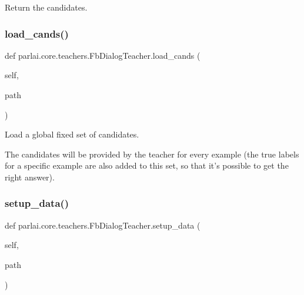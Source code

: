 \begin{DoxyVerb}Return the candidates.
\end{DoxyVerb}
 \mbox{\label{classparlai_1_1core_1_1teachers_1_1FbDialogTeacher_ae6f10486ddf691ee868d33ea2c9dc295}} 
\subsubsection{\texorpdfstring{load\+\_\+cands()}{load\_cands()}}
{\footnotesize\ttfamily def parlai.\+core.\+teachers.\+Fb\+Dialog\+Teacher.\+load\+\_\+cands (\begin{DoxyParamCaption}\item[{}]{self,  }\item[{}]{path }\end{DoxyParamCaption})}

\begin{DoxyVerb}Load a global fixed set of candidates.

The candidates will be provided by the teacher for every example (the true
labels for a specific example are also added to this set, so that it's possible
to get the right answer).
\end{DoxyVerb}
 \mbox{\label{classparlai_1_1core_1_1teachers_1_1FbDialogTeacher_a6cb23867e396fac5fdcde509b5da3942}} 
\subsubsection{\texorpdfstring{setup\+\_\+data()}{setup\_data()}}
{\footnotesize\ttfamily def parlai.\+core.\+teachers.\+Fb\+Dialog\+Teacher.\+setup\+\_\+data (\begin{DoxyParamCaption}\item[{}]{self,  }\item[{}]{path }\end{DoxyParamCaption})}

